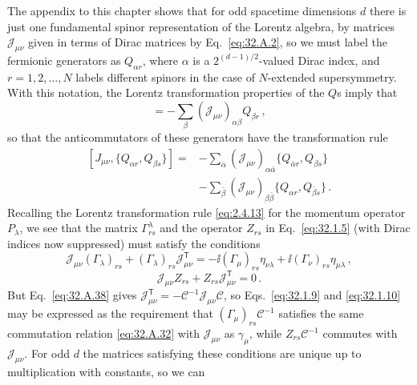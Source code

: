 The appendix to this chapter shows that for odd spacetime dimensions \(d\)
there is just one fundamental spinor representation of the Lorentz algebra,
by matrices \(\mathcal J_{\mu\nu}\) given in terms of Dirac matrices by
Eq.~\eqref{eq:32.A.2}, so we must label the fermionic generators as
\(Q_{\alpha r}\), where \(\alpha\) is a \(2^{(d-1)/2}\)-valued Dirac
index, and \(r=1,2,\ldots,N\) labels different spinors in the case of
\(N\)-extended supersymmetry. With this notation, the Lorentz transformation
properties of the \(Q\)s imply that
\begin{equation}
  [J_{\mu\nu},Q_{\alpha r}]
  =-\sum_\beta(\mathcal J_{\mu\nu})_{\alpha\beta}Q_{\beta r}\,,
  \tag{32.1.8}\label{eq:32.1.8}
\end{equation}
so that the anticommutators of these generators have the transformation rule
\[
  \begin{aligned}
  [J_{\mu\nu},\{Q_{\alpha r},Q_{\beta s}\}]
  ={}&-\sum_{\bar\alpha}
    (\mathcal J_{\mu\nu})_{\alpha\bar\alpha}
    \{Q_{\bar\alpha r},Q_{\beta s}\}
  \\
  &-\sum_{\bar\beta}
    (\mathcal J_{\mu\nu})_{\beta\bar\beta}
    \{Q_{\alpha r},Q_{\bar\beta s}\}\,.
  \end{aligned}
\]
Recalling the Lorentz transformation rule \eqref{eq:2.4.13} for the
momentum operator \(P_\lambda\), we see that the matrix
\(\Gamma^\lambda_{rs}\) and the operator \(Z_{rs}\) in
Eq.~\eqref{eq:32.1.5} (with Dirac indices now suppressed) must satisfy the
conditions
\begin{equation}
  \mathcal J_{\mu\nu}(\Gamma_\lambda)_{rs}
  +(\Gamma_\lambda)_{rs}\mathcal J_{\mu\nu}^{\mathsf T}
  =-\ii(\Gamma_\mu)_{rs}\eta_{\nu\lambda}
   +\ii(\Gamma_\nu)_{rs}\eta_{\mu\lambda}\,,
  \tag{32.1.9}\label{eq:32.1.9}
\end{equation}
\begin{equation}
  \mathcal J_{\mu\nu}Z_{rs}
  +Z_{rs}\mathcal J_{\mu\nu}^{\mathsf T}=0\,.
  \tag{32.1.10}\label{eq:32.1.10}
\end{equation}
But Eq.~\eqref{eq:32.A.38} gives
\(\mathcal J_{\mu\nu}^{\mathsf T}
=-\mathcal C^{-1}\mathcal J_{\mu\nu}\mathcal C\), so
Eqs.~\eqref{eq:32.1.9} and \eqref{eq:32.1.10} may be expressed as the
requirement that \((\Gamma_\mu)_{rs}\mathcal C^{-1}\) satisfies the same
commutation relation \eqref{eq:32.A.32} with \(\mathcal J_{\mu\nu}\) as
\(\gamma_\mu\), while \(Z_{rs}\mathcal C^{-1}\) commutes with
\(\mathcal J_{\mu\nu}\). For odd \(d\) the matrices satisfying these
conditions are unique up to multiplication with constants, so we can
